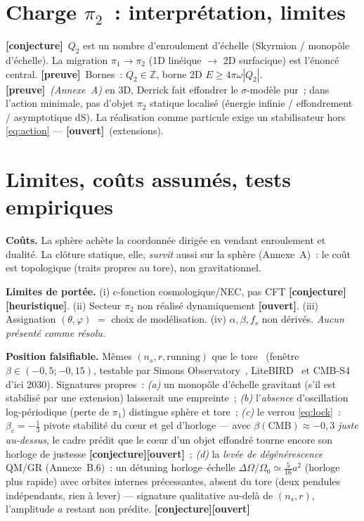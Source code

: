 \documentclass[11pt]{article}
\newcommand{\preuve}{{\small\textbf{[preuve]}}}
\newcommand{\conj}{{\small\textbf{[conjecture]}}}
\newcommand{\heur}{{\small\textbf{[heuristique]}}}
\newcommand{\ouv}{{\small\textbf{[ouvert]}}}
\theoremstyle{definition}
\begin{document}
\section{Charge $\pi_2$~: interpr\'etation, limites}
\conj\ $Q_2$ est un nombre d'enroulement d'\'echelle (Skyrmion / monop\^ole d'\'echelle). La migration
$\pi_1\to\pi_2$ (1D lin\'eique $\to$ 2D surfacique) est l'\'enonc\'e central. \preuve\ Bornes~:
$Q_2\in\mathbb{Z}$, borne 2D $E\ge4\pi\omega|Q_2|$. \preuve\ \emph{(Annexe~A)} en 3D, Derrick fait
effondrer le $\sigma$-mod\`ele pur~; dans l'action minimale, pas d'objet $\pi_2$ statique localis\'e
(\'energie infinie / effondrement / asymptotique dS). La r\'ealisation comme particule exige un
stabilisateur hors \eqref{eq:action} --- \ouv\ (extensions).

\section{Limites, co\^uts assum\'es, tests empiriques}
\textbf{Co\^uts.} La sph\`ere ach\`ete la coordonn\'ee dirig\'ee en vendant enroulement et dualit\'e. La
cl\^oture statique, elle, \emph{survit} aussi sur la sph\`ere (Annexe~A)~: le co\^ut est topologique
(traits propres au tore), non gravitationnel.

\textbf{Limites de port\'ee.} (i) c-fonction cosmologique/NEC, pas CFT \conj\heur. (ii) Secteur $\pi_2$
non r\'ealis\'e dynamiquement \ouv. (iii) Assignation $(\theta,\varphi)$ $=$ choix de mod\'elisation. (iv)
$\alpha,\beta,f_s$ non d\'eriv\'es. \emph{Aucun pr\'esent\'e comme r\'esolu.}

\textbf{Position falsifiable.} M\^emes $(n_s,r,\text{running})$ que le tore~\cite{Planck2018X,BICEPKeck2021} (fen\^etre
$\beta\in(-0{,}5;-0{,}15)$, testable par Simons Observatory~\cite{SimonsObs2019}, LiteBIRD~\cite{LiteBIRD2023} et CMB-S4~\cite{CMBS4Book2016} d'ici 2030). Signatures propres~:
\emph{(a)} un monop\^ole d'\'echelle gravitant (s'il est stabilis\'e par une extension) laisserait une
empreinte~; \emph{(b)} l'\emph{absence} d'oscillation log-p\'eriodique (perte de $\pi_1$) distingue
sph\`ere et tore~; \emph{(c)} le verrou \eqref{eq:lock}~: $\beta_c=-\tfrac13$ pivote stabilit\'e du c\oe ur
et gel d'horloge --- avec $\beta(\text{CMB})\approx-0{,}3$ \emph{juste au-dessus}, le cadre pr\'edit que le
c\oe ur d'un objet effondr\'e tourne encore son horloge de justesse \conj\ouv~; \emph{(d)} la
\emph{lev\'ee de d\'eg\'en\'erescence} QM/GR (Annexe~B.6)~: un d\'etuning horloge--\'echelle
$\Delta\Omega/\Omega_0\simeq\tfrac{5}{16}a^2$ (horloge plus rapide) avec orbites internes pr\'ecessantes,
absent du tore (deux pendules ind\'ependants, rien \`a lever) --- signature qualitative au-del\`a de
$(n_s,r)$, l'amplitude $a$ restant non pr\'edite. \conj\ouv
\end{document}
